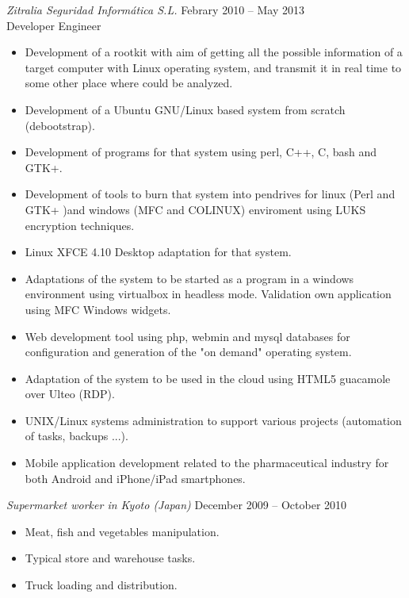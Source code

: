 \documentclass[10pt]{res} %
\begin{document}
\begin{resume}
{\sl Zitralia Seguridad Informática S.L.} \hfill Febrary 2010 -- May 2013\\
\hfill Developer Engineer
\begin{itemize} \itemsep -2pt %
\item Development of a rootkit with aim of getting all the possible information of a target computer with Linux operating system, and transmit it in real time to some other place where could be analyzed.
\item Development of a Ubuntu GNU/Linux based system from scratch (debootstrap). 
\item Development of programs for that system using perl, C++, C, bash and GTK+.
\item Development of tools to burn that system into pendrives for linux (Perl and GTK+ )and windows (MFC and COLINUX) enviroment using LUKS encryption techniques.
\item Linux XFCE 4.10 Desktop adaptation for that system.
\item Adaptations of the system to be started as a program in a windows environment using virtualbox in headless mode. Validation own application using MFC Windows widgets.
\item Web development tool using php, webmin and mysql databases for configuration and generation of the "on demand" operating system.
\item Adaptation of the system to be used in the cloud using HTML5 guacamole over Ulteo (RDP).
\item UNIX/Linux systems administration to support various projects (automation of tasks, backups ...).
\item Mobile application development related to the pharmaceutical industry for both Android and iPhone/iPad smartphones.
\end{itemize}

{\sl Supermarket worker in Kyoto (Japan)} \hfill December 2009 -- October 2010\\
\begin{itemize} \itemsep -2pt %
\item Meat, fish and vegetables manipulation.
\item Typical store and warehouse tasks.
\item Truck loading and distribution.
\end{itemize} 


\end{resume}
\end{document}
